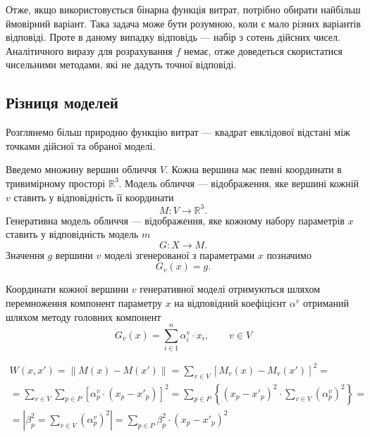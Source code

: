 Отже, якщо використовується бінарна функція витрат,
потрібно обирати найбільш ймовірний варіант.
Така задача може бути розумною, коли є мало різних варіантів відповіді.
Проте в даному випадку відповідь --- набір з сотень дійсних чисел.
Аналітичного виразу для розрахування $f$ немає,
отже доведеться скористатися чисельними методами,
які не дадуть точної відповіді.

\subsection{Різниця моделей}

Розглянемо більш природню функцію витрат ---
квадрат евклідової відстані між точками дійсної та обраної моделі.

Введемо множину вершин обличчя $V$.
Кожна вершина має певні координати в тривимірному просторі $\mathbb{R}^3$.
Модель обличчя --- відображення,
яке вершині кожній $v$ ставить у відповідність її координати
\begin{equation*}
  M: V \rightarrow \mathbb{R}^3.
\end{equation*}
Генеративна модель обличчя --- відображення,
яке кожному набору параметрів $x$ ставить у відповідність модель $m$
\begin{equation*}
  G: X \rightarrow M.
\end{equation*}
Значення $g$ вершини $v$ моделі згенерованої з параметрами $x$ позначимо
\begin{equation*}
  G_v\left( x \right) = g.
\end{equation*}

Координати кожної вершини $v$ генеративної моделі отримуються шляхом
перемноження компонент параметру $x$ на відповідний коефіцієнт $\alpha^v$
отриманий шляхом методу головних компонент
\begin{equation*}
  G_v\left( x \right) = \sum_{i \in 1}^n \alpha_i^v \cdot x_i,
  \qquad v \in V
\end{equation*}

\begin{equation*}
    \begin{split}
      W \left( x, x' \right)
      = \left\| M\left( x \right) - M\left( x' \right) \right\|
      = \sum_{v \in V} \left[
          M_v\left( x \right) - M_v\left( x' \right)
        \right]^2 = \\
      = \sum_{v \in V} \sum_{p \in P} \left[
          \alpha_p^v \cdot \left( x_p - x'_p \right)
        \right]^2
      = \sum_{p \in P} \left\{ \left( x_p - x'_p \right)^2
        \cdot \sum_{v \in V} \left( \alpha_p^v \right)^2 \right\} = \\
      = \left| \beta_p^2 = \sum_{v \in V} \left( \alpha_p^v \right)^2 \right|
      = \sum_{p \in P}
          \beta_p^2 \cdot \left( x_p - x'_p \right)^2
    \end{split}
\end{equation*}

